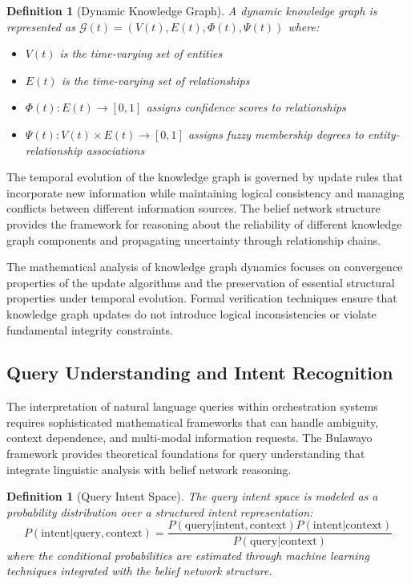 \documentclass[12pt,a4paper]{article}
\newtheorem{definition}[theorem]{Definition}
\begin{document}
\begin{definition}[Dynamic Knowledge Graph]
A dynamic knowledge graph is represented as $\mathcal{G}(t) = (V(t), E(t), \Phi(t), \Psi(t))$ where:
\begin{itemize}
\item $V(t)$ is the time-varying set of entities
\item $E(t)$ is the time-varying set of relationships
\item $\Phi(t) : E(t) \rightarrow [0,1]$ assigns confidence scores to relationships
\item $\Psi(t) : V(t) \times E(t) \rightarrow [0,1]$ assigns fuzzy membership degrees to entity-relationship associations
\end{itemize}
\end{definition}

The temporal evolution of the knowledge graph is governed by update rules that incorporate new information while maintaining logical consistency and managing conflicts between different information sources. The belief network structure provides the framework for reasoning about the reliability of different knowledge graph components and propagating uncertainty through relationship chains.

The mathematical analysis of knowledge graph dynamics focuses on convergence properties of the update algorithms and the preservation of essential structural properties under temporal evolution. Formal verification techniques ensure that knowledge graph updates do not introduce logical inconsistencies or violate fundamental integrity constraints.

\subsection{Query Understanding and Intent Recognition}

The interpretation of natural language queries within orchestration systems requires sophisticated mathematical frameworks that can handle ambiguity, context dependence, and multi-modal information requests. The Bulawayo framework provides theoretical foundations for query understanding that integrate linguistic analysis with belief network reasoning.

\begin{definition}[Query Intent Space]
The query intent space is modeled as a probability distribution over a structured intent representation:
\begin{equation}
P(\text{intent} | \text{query}, \text{context}) = \frac{P(\text{query} | \text{intent}, \text{context}) P(\text{intent} | \text{context})}{P(\text{query} | \text{context})}
\end{equation}
where the conditional probabilities are estimated through machine learning techniques integrated with the belief network structure.
\end{definition}
\end{document}
